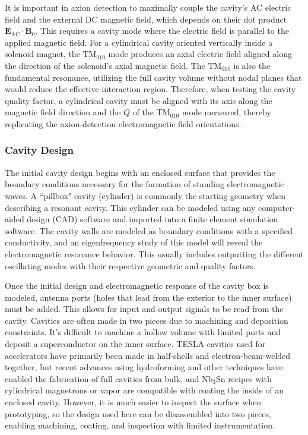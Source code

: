     It is important in axion detection to maximally couple the cavity's AC electric field and the external DC magnetic field, which depends on their dot product $\mathbf{E}_{\text{AC}} \cdot \mathbf{B}_0$. This requires a cavity mode where the electric field is parallel to the applied magnetic field. For a cylindrical cavity oriented vertically inside a solenoid magnet, the TM$_{010}$ mode produces an axial electric field aligned along the direction of the solenoid's axial magnetic field. The TM$_{010}$ is also the fundamental resonance, utilizing the full cavity volume without nodal planes that would reduce the effective interaction region. Therefore, when testing the cavity quality factor, a cylindrical cavity must be aligned with its axis along the magnetic field direction and the $Q$ of the TM$_{010}$ mode measured, thereby replicating the axion-detection electromagnetic field orientations.


    \subsubsection{Cavity Design}\label{sec:cavitydesign}

    The initial cavity design begins with an enclosed surface that provides the boundary conditions necessary for the formation of standing electromagnetic waves. A ``pillbox" cavity (cylinder) is commonly the starting geometry when describing a resonant cavity. This cylinder can be modeled using any computer-aided design (CAD) software and imported into a finite element simulation software. The cavity walls are modeled as boundary conditions with a specified conductivity, and an eigenfrequency study of this model will reveal the electromagnetic resonance behavior. This usually includes outputting the different oscillating modes with their respective geometric and quality factors. 

    Once the initial design and electromagnetic response of the cavity box is modeled, antenna ports (holes that lead from the exterior to the inner surface) must be added. This allows for input and output signals to be read from the cavity. Cavities are often made in two pieces due to machining and deposition constraints. It's difficult to machine a hollow volume with limited ports and deposit a superconductor on the inner surface. TESLA cavities used for accelerators have primarily been made in half-shells and electron-beam-welded together, but recent advances using hydroforming and other techniques have enabled the fabrication of full cavities from bulk, and Nb$_3$Sn recipes with cylindrical magnetrons or vapor are compatible with coating the inside of an enclosed cavity. However, it is much easier to inspect the surface when prototyping, so the design used here can be disassembled into two pieces, enabling machining, coating, and inspection with limited instrumentation. 


